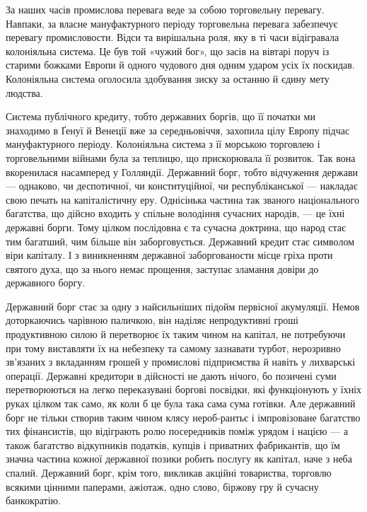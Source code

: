 За наших часів промислова перевага веде за собою торговельну перевагу. Навпаки, за власне
мануфактурного періоду торговельна перевага забезпечує перевагу промисловости. Відси та вирішальна
роля, яку в ті часи відігравала колоніяльна система. Це був той «чужий бог», що засів на вівтарі
поруч із старими божками Европи й одного чудового дня одним ударом усіх їх поскидав. Колоніяльна
система оголосила здобування зиску за останню й єдину мету людства.

Система публічного кредиту, тобто державних боргів, що її початки ми знаходимо в Ґенуї й Венеції вже
за середньовіччя, захопила цілу Европу підчас мануфактурного періоду. Колоніяльна система з її
морською торговлею і торговельними війнами була за теплицю, що прискорювала її розвиток. Так вона
вкоренилася насамперед у Голляндії. Державний борг, тобто відчуження держави — однаково, чи
деспотичної, чи конституційної, чи республіканської — накладає свою печать на капіталістичну еру.
Однісінька частина так званого національного багатства, що дійсно входить у спільне володіння
сучасних народів,
— це їхні державні борги. Тому цілком послідовна є та сучасна доктрина, що народ стає тим
багатший, чим більше він заборговується. Державний кредит стає символом віри капіталу. І з
виникненням державної заборгованости місце гріха проти
святого духа, що за нього немає прощення, заступає зламання довіри до державного боргу.

Державний борг стає за одну з найсильніших підойм первісної акумуляції. Немов доторкаючись чарівною
паличкою, він наділяє непродуктивні гроші продуктивною силою й перетворює їх таким чином на капітал,
не потребуючи при тому виставляти
їх на небезпеку та самому зазнавати турбот, нерозривно зв’язаних з вкладанням грошей у промислові
підприємства й навіть у лихварські операції. Державні кредитори в дійсності не дають нічого, бо
позичені суми перетворюються на легко переказувані
боргові посвідки, які функціонують у їхніх руках цілком так само, як коли б це була така сама сума
готівки. Але державний борг не тільки створив таким чином клясу нероб-рантьє і імпровізоване
багатство тих фінансистів, що відіграють ролю посередників
поміж урядом і нацією — а також багатство відкупників податків, купців і приватних фабрикантів, що
їм значна частина кожної державної позики робить послугу як капітал, наче з неба спалий. Державний
борг, крім того, викликав акційні товариства,
торговлю всякими цінними паперами, ажіотаж, одно слово, біржову гру й сучасну банкократію.

